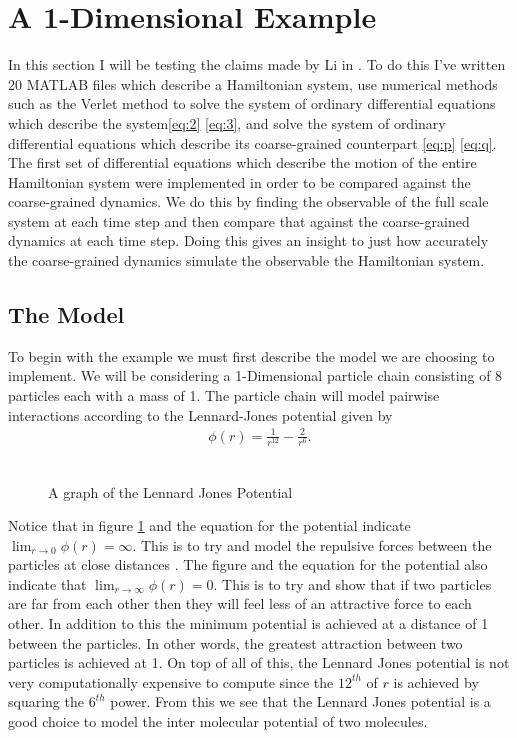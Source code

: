 \section{A 1-Dimensional Example}

In this section I will be testing the claims made by Li in \citep{Li2010}. To do this I've written 20 MATLAB files which describe a Hamiltonian system, use numerical methods such as the Verlet method to solve the system of ordinary differential equations which describe the system\eqref{eq:2} \eqref{eq:3}, and solve the system of ordinary differential equations which describe its coarse-grained counterpart \eqref{eq:p} \eqref{eq:q}. The first set of differential equations which describe the motion of the entire Hamiltonian system were implemented in order to be compared against the coarse-grained dynamics. We do this by finding the observable of the full scale system at each time step and then compare that against the coarse-grained dynamics at each time step. Doing this gives an insight to just how accurately the coarse-grained dynamics simulate the observable the Hamiltonian system.

\subsection{The Model}
To begin with the example we must first describe the model we are choosing to implement. We will be considering a 1-Dimensional particle chain consisting of 8 particles each with a mass of 1. The particle chain will model pairwise interactions according to the Lennard-Jones potential given by 
\begin{align*}
\phi(r) = \frac{1}{r^{12}} - \frac{2}{r^6}.
\end{align*}\\

\begin{figure}[h]
\centering
\def\svgscale{0.55}

\caption{A graph of the Lennard Jones Potential} \label{figure:3}
\end{figure}


Notice that in figure \ref{figure:3}  and the equation for the potential indicate $\lim_{r\to 0} \phi(r)=\infty$. This is to try and model the repulsive forces between the particles at close distances \cite{BenLeimkuhler2015}. The figure and the equation for the potential also indicate that $\lim_{r\to \infty} \phi(r)= 0$. This is to try and show that if two particles are far from each other then they will feel less of an attractive force to each other. In addition to this the minimum potential is achieved at a distance of 1 between the particles. In other words, the greatest attraction between two particles is achieved at 1. On top of all of this, the Lennard Jones potential is not very computationally expensive to compute since the $12^{th}$ of $r$ is achieved by squaring the $6^{th}$ power\cite{BenLeimkuhler2015}. From this we see that the Lennard Jones potential is a good choice to model the inter molecular potential of two molecules.

